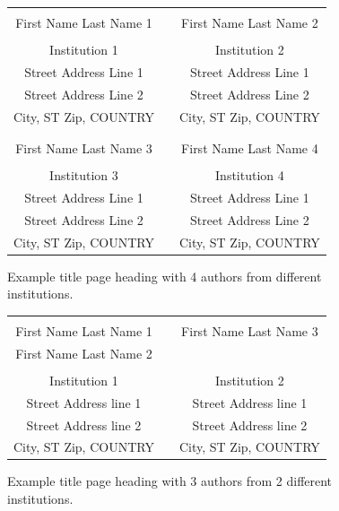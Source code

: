 \documentclass{wscpaperproc}
\theoremstyle{wsc}
\begin{document}
\begin{figure}[htb]
{
\centering
\begin{tabular}{ccc}
\phantom{Adjust spacing using these entries} & \phantom{intermediate space} & \phantom{Adjust spacing using these entries} \\
First Name Last Name 1 & & First Name Last Name 2 \\
\\
Institution 1 & & Institution 2 \\
Street Address Line 1 & & Street Address Line 1 \\
Street Address Line 2 & & Street Address Line 2 \\
City, ST Zip, COUNTRY & & City, ST Zip, COUNTRY \\
\\ \\
First Name Last Name 3 & & First Name Last Name 4 \\
\\
Institution 3 & & Institution 4 \\
Street Address Line 1 & & Street Address Line 1 \\
Street Address Line 2 & & Street Address Line 2 \\
City, ST Zip, COUNTRY & & City, ST Zip, COUNTRY
\end{tabular}
\caption{Example title page heading with 4 authors from different institutions.\label{fig: 4 different}}
}
\end{figure}

\begin{figure}[htb]
{
\centering
\begin{tabular}{ccc}
\phantom{Adjust spacing using these entries} & \phantom{intermediate space} & \phantom{Adjust spacing using these entries} \\
First Name Last Name 1 & & First Name Last Name 3 \\
First Name Last Name 2 & & \\
\\
Institution 1 & & Institution 2 \\
Street Address line 1 & & Street Address line 1 \\
Street Address line 2 & & Street Address line 2 \\
City, ST Zip, COUNTRY & & City, ST Zip, COUNTRY \\
\end{tabular}
\caption{Example title page heading with 3 authors from 2 different institutions.\label{fig: 5 different}}
}
\end{figure}
\end{document}
